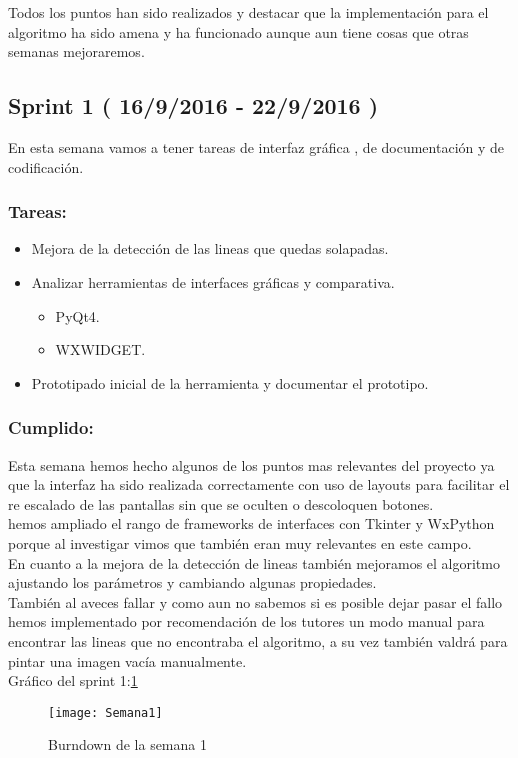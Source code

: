 Todos los puntos han sido realizados y destacar que la implementación para el algoritmo ha sido amena y ha funcionado aunque aun tiene cosas que otras semanas mejoraremos.

\subsection{Sprint 1 ( 16/9/2016 - 22/9/2016 )}
 En esta semana vamos a tener tareas de interfaz gráfica , de documentación y de codificación.
\subsubsection{Tareas:}
\begin{itemize}
\item Mejora de la detección de las lineas que quedas solapadas. 
\item Analizar herramientas de interfaces gráficas y comparativa.
	\begin{itemize}
	\item PyQt4. 
	\item WXWIDGET.
	\end{itemize}
\item Prototipado inicial de la herramienta y documentar el prototipo.
\end{itemize}



\subsubsection{Cumplido:}
Esta semana hemos hecho algunos de los puntos mas relevantes del proyecto ya que la interfaz ha sido realizada correctamente con uso de layouts para facilitar el re escalado de las pantallas sin que se oculten o descoloquen botones.\\
hemos ampliado el rango de frameworks de interfaces con Tkinter y WxPython porque al investigar vimos que también eran muy relevantes en este campo.\\
En cuanto a la mejora de la detección de lineas también mejoramos el algoritmo ajustando los parámetros y cambiando algunas propiedades.\\
También al aveces fallar y como aun no sabemos si es posible dejar pasar el fallo hemos implementado por recomendación de los tutores un modo manual para encontrar las lineas que no encontraba el algoritmo, a su vez también valdrá para pintar una imagen vacía manualmente.\\
Gráfico del sprint 1:\ref{fig:A.2.1}
\begin{figure}[h]
\centering
\texttt{[image: Semana1]}
\caption{Burndown de la semana 1}
\label{fig:A.2.1}
\end{figure}

